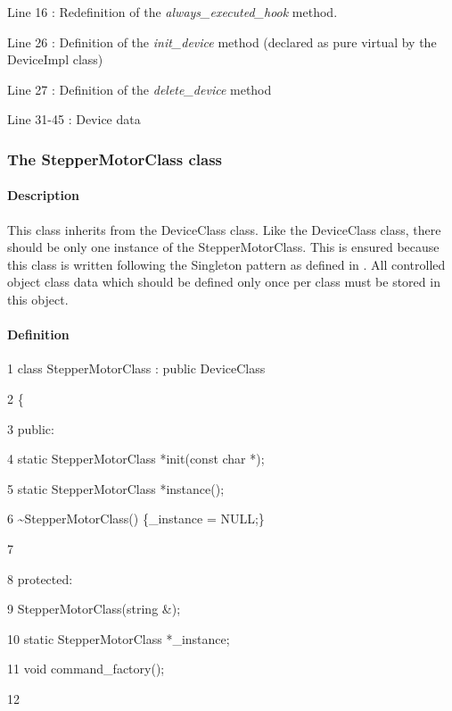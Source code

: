 Line 16 : Redefinition of the \emph{always\_executed\_hook}
method.

Line 26 : Definition of the \emph{init\_device}
method (declared as pure virtual by the DeviceImpl class)

Line 27 : Definition of the \emph{delete\_device}
method

Line 31-45 : Device data


\subsubsection{The StepperMotorClass class}


\paragraph{Description}

This class inherits from the DeviceClass class.
Like the DeviceClass class, there should be only one instance of the
StepperMotorClass. This is ensured because this class is written following
the Singleton pattern as defined in \cite{Patterns}.
All controlled object class data which should be defined only once
per class must be stored in this object.


\paragraph{Definition }



     1  class StepperMotorClass : public DeviceClass

     2  \{

3  public:

     4          static StepperMotorClass {*}init(const char {*});

     5          static StepperMotorClass {*}instance();

     6          \textasciitilde{}StepperMotorClass() \{\_instance
= NULL;\}

     7          

     8  protected:

     9          StepperMotorClass(string \&);

    10          static StepperMotorClass {*}\_instance;

    11          void command\_factory();

    12          

